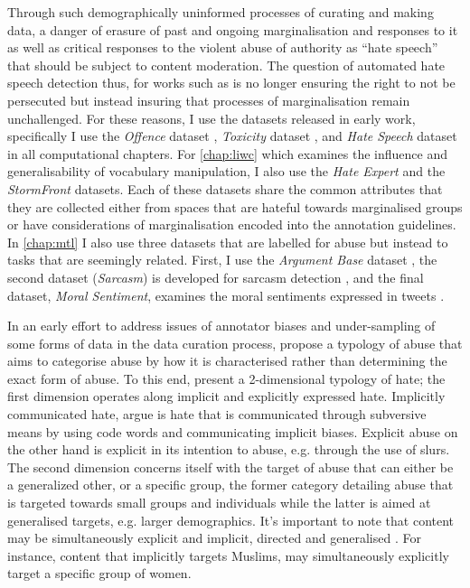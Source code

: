 Through such demographically uninformed processes of curating and making data, a danger of erasure of past and ongoing marginalisation and responses to it as well as critical responses to the violent abuse of authority as ``hate speech'' that should be subject to content moderation. 
The question of automated hate speech detection thus, for works such as \citet{Salminen:2018} is no longer ensuring the right to not be persecuted but instead insuring that processes of marginalisation remain unchallenged.
For these reasons, I use the datasets released in early work, specifically I use the \textit{Offence} dataset \citep{Davidson:2017}, \textit{Toxicity} dataset \citep{Wulczyn:2017}, and \textit{Hate Speech} dataset \citep{Waseem-Hovy:2016} in all computational chapters. 
For \autoref{chap:liwc} which examines the influence and generalisability of vocabulary manipulation, I also use the \textit{Hate Expert} \citep{Waseem:2016} and the \textit{StormFront} \citep{Garcia:2019} datasets. 
Each of these datasets share the common attributes that they are collected either from spaces that are hateful towards marginalised groups or have considerations of marginalisation encoded into the annotation guidelines. 
In \autoref{chap:mtl} I also use three datasets that are labelled for abuse but instead to tasks that are seemingly related. 
First, I use the \textit{Argument Base} dataset \citep{Oraby_factfeel:2015}, the second dataset (\textit{Sarcasm}) is developed for sarcasm detection \citep{Oraby_sarcasm:2016}, and the final dataset, \textit{Moral Sentiment}, examines the moral sentiments expressed in tweets \citep{Hoover:2019}.

In an early effort to address issues of annotator biases and under-sampling of some forms of data in the data curation process, \citet{Waseem:2017} propose a typology of abuse that aims to categorise abuse by how it is characterised rather than determining the exact form of abuse.
To this end, \citet{Waseem:2017} present a 2-dimensional typology of hate; the first dimension operates along implicit and explicitly expressed hate. 
Implicitly communicated hate, \citet{Waseem:2017} argue is hate that is communicated through subversive means by using code words and communicating implicit biases. 
Explicit abuse on the other hand is explicit in its intention to abuse, e.g. through the use of slurs. 
The second dimension concerns itself with the target of abuse that can either be a generalized other, or a specific group, the former category detailing abuse that is targeted towards small groups and individuals while the latter is aimed at generalised targets, e.g. larger demographics.
It's important to note that content may be simultaneously explicit and implicit, directed and generalised \citep{Waseem:2017}. 
For instance, content that implicitly targets Muslims, may simultaneously explicitly target a specific group of women.

